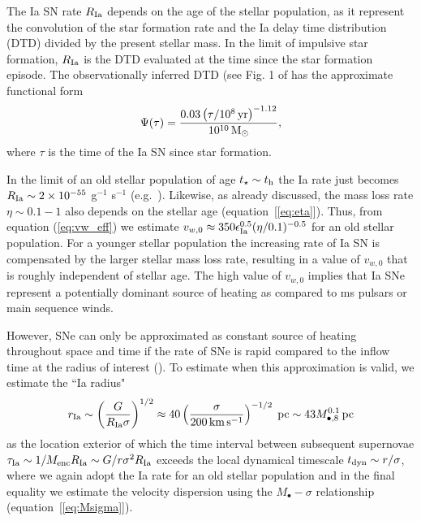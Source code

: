 \documentclass[usenatbib,fleqn]{mn2e}
\newcommand{\RateIa}{R_{\rm Ia}}
\begin{document}
The Ia SN rate $\RateIa$ depends on the age of the stellar population, as it represent the convolution of the star formation rate and the Ia delay time distribution (DTD) divided by the present stellar mass.  In the limit of impulsive star formation, $\RateIa$ is the DTD evaluated at the time since the star formation episode.  The observationally inferred DTD (see Fig. 1 of \citet{MaozMannucci+:2012a} has the approximate functional form
\begin{align}
    \Psi(\tau)=\frac{0.03
      \left(\tau/10^8\,{\rm yr}\right)^{-1.12}}{10^{10} \,{\rm M_\odot}},
  \end{align}
where $\tau$ is the time of the Ia SN since star formation.  

In the limit of an old stellar population of age $t_{\star} \sim t_{\rm h}$ the Ia rate just becomes $R_{\rm Ia} \sim 2\times 10^{-55} $ g$^{-1}$ s$^{-1}$ (e.g.~\citealt{Scannapieco&Bildsten05}).  Likewise, as already discussed, the mass loss rate $\eta \sim 0.1-1$ also depends on the stellar age (equation~[\ref{eq:eta}]).  Thus, from equation (\ref{eq:vw_eff}) we estimate $v_{w,0} \approx 350\epsilon_{\rm Ia}^{0.5}(\eta/0.1)^{-0.5}$ for an old stellar population.  For a younger stellar population the increasing rate of Ia SN is compensated by the larger stellar mass loss rate, resulting in a value of $v_{w,0}$ that is roughly independent of stellar age.  The high value of $v_{w,0}$ implies that Ia SNe represent a potentially dominant source of heating as compared to ms pulsars or main sequence winds.  

However, SNe can only be approximated as constant source of heating throughout space and time if the rate of SNe is rapid compared to the inflow time at the radius of interest (\citealt{ShcherbakovWong+:2014a}).  To estimate when this approximation is valid, we estimate the ``Ia radius" 
\begin{eqnarray}
r_{\rm Ia} \sim \left(\frac{G}{R_{\rm Ia}\sigma}\right)^{1/2} \approx 40\left(\frac{\sigma}{200\,{\rm km\,s^{-1}}}\right)^{-1/2} \; {\rm pc} \sim 43 M_{\bullet,8}^{0.1}\,{\rm pc}
\label{eq:rIa}
\end{eqnarray}
as the location exterior of which the time interval between subsequent supernovae $\tau_{\rm Ia} \sim 1/M_{\rm enc}R_{\rm Ia} \sim G/r\sigma^{2}R_{\rm Ia}$ exceeds the local dynamical timescale $t_{\rm dyn} \sim r/\sigma$, where we again adopt the Ia rate for an old stellar population and in the final equality we estimate the velocity dispersion using the $M_{\bullet}-\sigma$ relationship (equation~[\ref{eq:Msigma}]).
\end{document}
